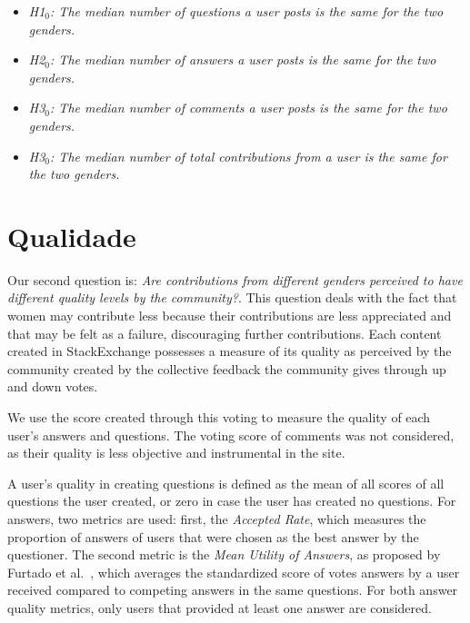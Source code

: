 \begin{itemize}
    \item \textit{H1$_0$: The median number of questions a user posts is the same for the two genders.}
    \item \textit{H2$_0$: The median number of answers a user posts is the same for the two genders.}
    \item \textit{H3$_0$: The median number of comments a user posts is the same for the two genders.}
    \item \textit{H3$_0$: The median number of total contributions from a user is the same for the two genders.}
\end{itemize}


\section{Qualidade} %
\label{sub:qualidade}

Our second question is: \textit{Are contributions from different genders perceived to have different quality levels by the community?}. This question deals with the fact that women may contribute less because their contributions are less appreciated and that may be felt as a failure, discouraging further contributions. 
Each content created in StackExchange possesses a measure of its quality as perceived by the community created by the collective feedback the community gives through up and down votes. 

We use the score created through this voting to measure the quality of each user's answers and questions. The voting score of comments was not considered, as their quality is less objective and instrumental in the site. 

A user's quality in creating questions is defined as the mean of all scores of all questions the user created, or zero in case the user has created no questions. For answers, two metrics are used: first, the \emph{Accepted Rate}, which measures the proportion of answers of users that were chosen as the best answer by the questioner. The second metric is the  \emph{Mean Utility of Answers}, as proposed by Furtado et al.~\cite{furtado2013contributor}, which averages the standardized score of votes answers by a user received compared to competing answers in the same questions. For both answer quality metrics, only users that provided at least one answer are considered.

